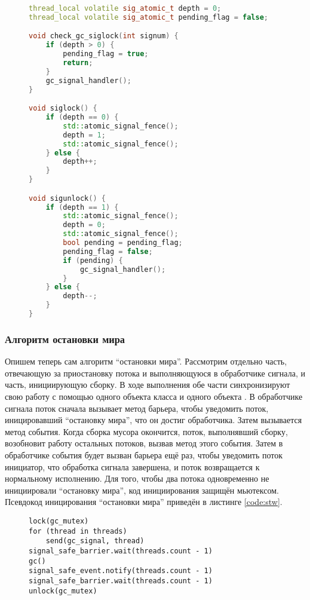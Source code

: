 \begin{figure}
\begin{lstlisting}[language={c++}, caption={Блокирование доставки сигналов}, label={code:siglock}, basicstyle=\small]
thread_local volatile sig_atomic_t depth = 0;
thread_local volatile sig_atomic_t pending_flag = false;

void check_gc_siglock(int signum) {
    if (depth > 0) {
        pending_flag = true;
        return;
    }
    gc_signal_handler();
}

void siglock() {
    if (depth == 0) {
        std::atomic_signal_fence();
        depth = 1;
        std::atomic_signal_fence();
    } else {
        depth++;
    }
}

void sigunlock() {
    if (depth == 1) {
        std::atomic_signal_fence();
        depth = 0;
        std::atomic_signal_fence();
        bool pending = pending_flag;
        pending_flag = false;
        if (pending) {
            gc_signal_handler();
        }
    } else {
        depth--;
    }
}
\end{lstlisting}
\end{figure}


\subsubsection{Алгоритм остановки мира}
Опишем теперь сам алгоритм ``остановки мира''. 
Рассмотрим отдельно часть, отвечающую за приостановку потока и выполняющуюся в 
обработчике сигнала, и часть, инициирующую сборку. 
В ходе выполнения обе части синхронизируют свою работу с помощью одного объекта класса 
 и одного объекта . 
В обработчике сигнала поток сначала вызывает метод  барьера, чтобы 
уведомить поток, иницировавший ``остановку мира'', что он достиг обработчика. 
Затем вызывается метод  события. 
Когда сборка мусора окончится, поток, выполнявший сборку, возобновит работу остальных 
потоков, вызвав метод  этого события. 
Затем в обработчике события будет вызван  барьера ещё раз, чтобы 
уведомить поток инициатор, что обработка сигнала завершена, и поток возвращается к 
нормальному исполнению. 
Для того, чтобы два потока одновременно не инициировали ``остановку мира'', код инициирования 
защищён мьютексом. 
Псевдокод иницирования ``остановки мира'' приведён в листинге \ref{code:stw}.

\begin{figure}[h!]
\begin{lstlisting}[caption={Остановка мира},label={code:stw}]
lock(gc_mutex)
for (thread in threads)
    send(gc_signal, thread)
signal_safe_barrier.wait(threads.count - 1)
gc()
signal_safe_event.notify(threads.count - 1)
signal_safe_barrier.wait(threads.count - 1)
unlock(gc_mutex)
\end{lstlisting}
\end{figure}


